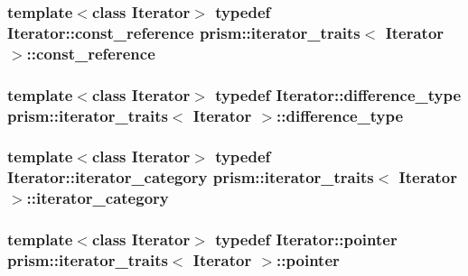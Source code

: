 \subsubsection[{\texorpdfstring{const\+\_\+reference}{const_reference}}]{\setlength{\rightskip}{0pt plus 5cm}template$<$class Iterator$>$ typedef Iterator\+::const\+\_\+reference {\bf prism\+::iterator\+\_\+traits}$<$ Iterator $>$\+::{\bf const\+\_\+reference}}\hypertarget{structprism_1_1iterator__traits_a27032f81f31f64773f63693623fd4023}{}\label{structprism_1_1iterator__traits_a27032f81f31f64773f63693623fd4023}
\subsubsection[{\texorpdfstring{difference\+\_\+type}{difference_type}}]{\setlength{\rightskip}{0pt plus 5cm}template$<$class Iterator$>$ typedef Iterator\+::difference\+\_\+type {\bf prism\+::iterator\+\_\+traits}$<$ Iterator $>$\+::{\bf difference\+\_\+type}}\hypertarget{structprism_1_1iterator__traits_ae78f6fab069fd9118d558db5d4f81d54}{}\label{structprism_1_1iterator__traits_ae78f6fab069fd9118d558db5d4f81d54}
\subsubsection[{\texorpdfstring{iterator\+\_\+category}{iterator_category}}]{\setlength{\rightskip}{0pt plus 5cm}template$<$class Iterator$>$ typedef Iterator\+::iterator\+\_\+category {\bf prism\+::iterator\+\_\+traits}$<$ Iterator $>$\+::{\bf iterator\+\_\+category}}\hypertarget{structprism_1_1iterator__traits_a3ae4da59bd72e7026c5fe2a23e799e1b}{}\label{structprism_1_1iterator__traits_a3ae4da59bd72e7026c5fe2a23e799e1b}
\subsubsection[{\texorpdfstring{pointer}{pointer}}]{\setlength{\rightskip}{0pt plus 5cm}template$<$class Iterator$>$ typedef Iterator\+::pointer {\bf prism\+::iterator\+\_\+traits}$<$ Iterator $>$\+::{\bf pointer}}\hypertarget{structprism_1_1iterator__traits_a74c12fd61a29bfd2a645a8d798e93810}{}\label{structprism_1_1iterator__traits_a74c12fd61a29bfd2a645a8d798e93810}
